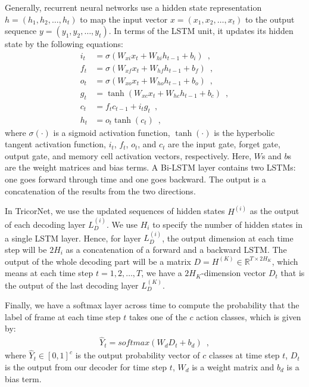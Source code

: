 \documentclass{article}
\begin{document}
Generally, recurrent neural networks use a hidden state representation $h = (h_1 , h_2, \dots , h_t)$ to map the input vector $x=(x_1,x_2,\dots,x_t)$ to the output sequence $y=(y_1,y_2,\dots,y_t)$. In terms of the LSTM unit, it updates its hidden state by the following equations: 
%
\begin{align}
i_t &= \sigma(W_{xi}x_t + W_{hi}h_{t-1} + b_{i}) \enspace, \nonumber\\
f_t &= \sigma(W_{xf}x_t + W_{hf}h_{t-1} + b_{f}) \enspace, \nonumber\\
o_t &= \sigma(W_{xo}x_t + W_{ho}h_{t-1} + b_{o}) \enspace, \nonumber\\
g_t &= \tanh(W_{xc}x_t + W_{hc}h_{t-1} + b_c) \enspace, \nonumber\\
c_t &= f_tc_{t-1} + i_tg_t \enspace, \nonumber\\
h_t &= o_t \tanh(c_t) \enspace, 
\end{align}
%
where $\sigma(\cdot)$ is a sigmoid activation function, $\tanh(\cdot)$ is the hyperbolic tangent activation function, $i_t$, $f_t$, $o_t$, and $c_t$ are the input gate, forget gate, output gate, and memory cell activation vectors, respectively. Here, $W$s and $b$s are the weight matrices and bias terms. A Bi-LSTM layer contains two LSTMs: one goes forward through time and one goes backward. The output is a concatenation of the results from the two directions. 

In TricorNet, we use the updated sequences of hidden states $H^{(i)}$ as the output of each decoding layer $L_{D}^{(i)}$.  We use $H_i$ to specify the number of hidden states in a single LSTM layer. Hence, for layer $L_{D}^{(i)}$, the output dimension at each time step will be $2H_i$ as a concatenation of a forward and a backward LSTM. The output of the whole decoding part will be a matrix $D = H^{(K)} \in \mathbb{R}^{T \times 2H_K}$, which means at each time step $t = 1,2,\dots,T$, we have a $2H_K$-dimension vector $D_t$ that is the output of the last decoding layer $L_{D}^{(K)}$.

Finally, we have a softmax layer across time to compute the probability that the label of frame at each time step $t$ takes one of the $c$ action classes, which is given by: 
%
\begin{align}
\hat Y_t = softmax(W_dD_t+b_d)
\enspace,
\end{align}
%
where $\hat Y_t \in [0, 1]^c$ is the output probability vector of $c$ classes at time step $t$, $D_t$ is the output from our decoder for time step $t$, $W_d$ is a weight matrix and $b_d$ is a bias term. 
\end{document}
